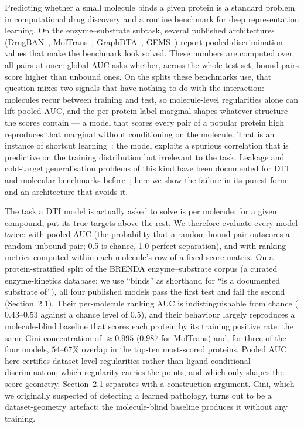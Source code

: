 \documentclass[11pt,a4paper]{article}
\begin{document}
Predicting whether a small molecule binds a given protein is a standard
problem in computational drug discovery and a routine benchmark for deep
representation learning. On the enzyme--substrate subtask, several published
architectures (DrugBAN~\citep{bai2023drugban},
MolTrans~\citep{huang2021moltrans}, GraphDTA~\citep{nguyen2021graphdta},
GEMS~\citep{wang2023gems}) report pooled discrimination values that make
the benchmark look solved. These numbers are computed over all pairs at once:
global AUC asks whether, across the whole test set, bound pairs score higher
than unbound ones. On the splits these benchmarks use, that question mixes
two signals that have nothing to do with the interaction: molecules recur
between training and test, so molecule-level regularities alone can lift
pooled AUC, and the per-protein label marginal shapes whatever structure the
scores contain --- a model that scores every pair of a popular protein high
reproduces that marginal without conditioning on the molecule. That is an
instance of shortcut learning~\citep{geirhos2020shortcut}: the model
exploits a spurious correlation that is predictive on the training
distribution but irrelevant to the task. Leakage and
cold-target generalisation problems of this kind have been documented for DTI
and molecular benchmarks before~\citep{pahikkala2015,wallach2018mostligands,
kapoor2023leakage,jiang2020dtigeneralisation}; here we show the failure in
its purest form and an architecture that avoids it.

The task a DTI model is actually asked to solve is per molecule: for a given
compound, put its true targets above the rest. We therefore evaluate every
model twice: with pooled AUC (the probability that a random bound pair
outscores a random unbound pair; 0.5 is chance, 1.0 perfect separation), and
with ranking metrics computed within each molecule's row of a fixed score
matrix. On a protein-stratified split of the BRENDA enzyme--substrate corpus
(a curated enzyme-kinetics database; we use ``binds'' as shorthand for
``is a documented substrate of''), all four published models pass the first
test and fail the second (Section~2.1). Their per-molecule ranking AUC is
indistinguishable from chance ($0.43$--$0.53$ against a chance level of
$0.5$), and their behaviour largely reproduces a molecule-blind
baseline that scores each protein by its training positive rate: the same
Gini concentration of $\approx 0.995$ ($0.987$ for MolTrans) and, for three
of the four models, $54$--$67\%$ overlap in the top-ten most-scored
proteins. Pooled AUC here certifies dataset-level
regularities rather than ligand-conditional discrimination; which
regularity carries the points, and which only shapes the score geometry,
Section~2.1 separates with a construction argument. Gini, which we
originally suspected of detecting a learned pathology, turns out to be a
dataset-geometry artefact: the molecule-blind baseline produces it without
any training.
\end{document}
